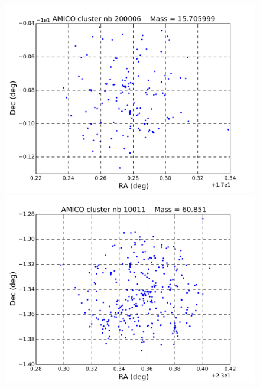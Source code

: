 \documentclass[a4paper,11pt]{article}
\numberwithin{equation}{section}
\begin{document}
\begin{figure}[H]
  	\begin{minipage}[t]{0.48\textwidth}
      \includegraphics[width=\linewidth]{200006.pdf}
  	  \end{minipage}
	  \hfill
    \begin{minipage}[t]{0.48\textwidth}

      \includegraphics[width=\linewidth]{10011.pdf}
  	\end{minipage}
  	
  	\vspace{-5pt}
  	

\end{figure}
\end{document}
